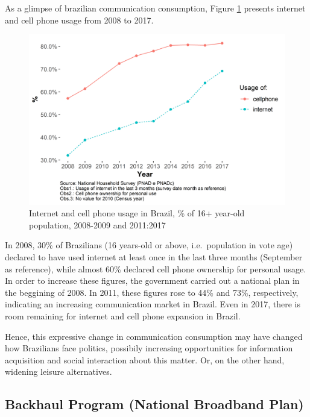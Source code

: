 \documentclass[12pt,]{article}
\begin{document}
As a glimpse of brazilian communication consumption, Figure \ref{fig:0}
presents internet and cell phone usage from 2008 to 2017.

\begin{figure}
\centering
\includegraphics{artigo1_files/figure-latex/internet_usage-1.png}
\caption{Internet and cell phone usage in Brazil, \% of 16+ year-old
population, 2008-2009 and 2011:2017 \label{fig:0}}
\end{figure}

In 2008, 30\% of Brazilians (16 years-old or above, i.e.~population in
vote age) declared to have used internet at least once in the last three
months (September as reference), while almost 60\% declared cell phone
ownership for personal usage. In order to increase these figures, the
government carried out a national plan in the beggining of 2008. In
2011, these figures rose to 44\% and 73\%, respectively, indicating an
increasing communication market in Brazil. Even in 2017, there is room
remaining for internet and cell phone expansion in Brazil.

Hence, this expressive change in communication consumption may have
changed how Brazilians face politics, possibily increasing opportunities
for information acquisition and social interaction about this matter.
Or, on the other hand, widening leisure alternatives.

\hypertarget{backhaul-program-national-broadband-plan}{%
\subsection{Backhaul Program (National Broadband
Plan)}\label{backhaul-program-national-broadband-plan}}
\end{document}
